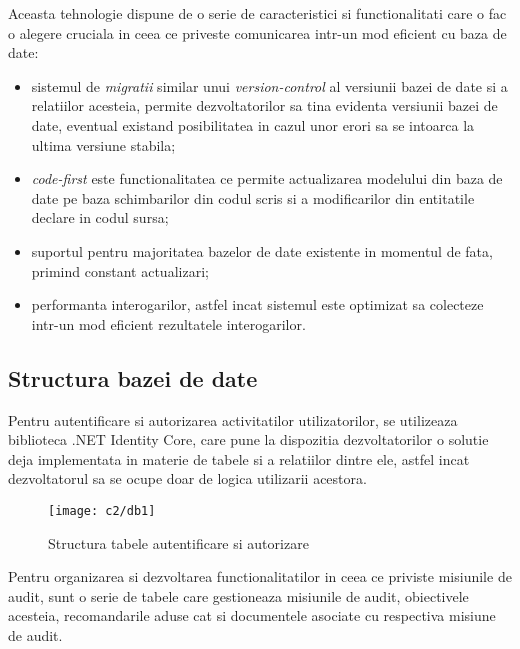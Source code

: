 Aceasta tehnologie dispune de o serie de caracteristici si functionalitati care o fac o alegere cruciala in ceea ce priveste comunicarea intr-un mod eficient cu baza de date:
\begin{itemize}
	
	\item sistemul de \textit{migratii} similar unui \textit{version-control} al versiunii bazei de date si a relatiilor acesteia, permite dezvoltatorilor sa tina evidenta versiunii bazei de date, eventual existand posibilitatea in cazul unor erori sa se intoarca la ultima versiune stabila;
	
	\item \textit{code-first} este functionalitatea ce permite actualizarea modelului din baza de date pe baza schimbarilor din codul scris si a modificarilor din entitatile declare in codul sursa;
	
	\item suportul pentru majoritatea bazelor de date existente in momentul de fata, primind constant actualizari;
	
	\item performanta interogarilor, astfel incat sistemul este optimizat sa colecteze intr-un mod eficient rezultatele interogarilor.
	 
\end{itemize}

\subsection*{Structura bazei de date}

Pentru autentificare si autorizarea activitatilor utilizatorilor, se utilizeaza biblioteca .NET Identity Core, care pune la dispozitia dezvoltatorilor o solutie deja implementata in materie de tabele si a relatiilor dintre ele, astfel incat dezvoltatorul sa se ocupe doar de logica utilizarii acestora.
 
\vspace{1cm}
\begin{figure}[h]
	\centering
	
	\texttt{[image: c2/db1]}
	\caption{Structura tabele autentificare si autorizare}
\end{figure}

Pentru organizarea si dezvoltarea functionalitatilor in ceea ce priviste misiunile de audit, sunt o serie de tabele care gestioneaza misiunile de audit, obiectivele acesteia, recomandarile aduse cat si documentele asociate cu respectiva misiune de audit.

